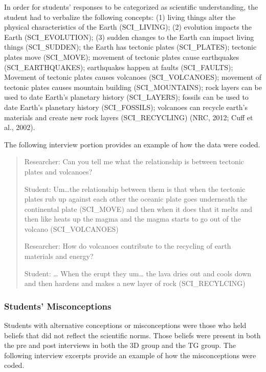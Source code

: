 \documentclass[11.5pt]{sig-alternate} %
\begin{document}
\begin{large}
In order for students’ responses to be categorized as scientific understanding, the student had to verbalize the following concepts: (1) living things alter the physical characteristics of the Earth (SCI\_LIVING); (2)  evolution impacts the Earth (SCI\_EVOLUTION); (3) sudden changes to the Earth can impact living things (SCI\_SUDDEN); the Earth has tectonic plates (SCI\_PLATES); tectonic plates move (SCI\_MOVE); movement of tectonic plates cause earthquakes (SCI\_EARTHQUAKES); earthquakes happen at faults (SCI\_FAULTS); Movement of tectonic plates causes volcanoes (SCI\_VOLCA\-NOES); movement of tectonic plates causes mountain building (SCI\_MOUNTAINS); rock layers can be used to date Earth’s planetary history (SCI\_LAYERS); fossils can be used to date Earth’s planetary history (SCI\_FOSSILS); volcanoes can recycle earth’s materials and create new rock layers  (SCI\_RECYCLING) (NRC, 2012; Cuff et al., 2002).

The following interview portion provides an example of how the data were coded. 

\begin{quote}

Researcher: Can you tell me what the relationship is between tectonic plates and volcanoes?	

Student: Um…the relationship between them is that when the tectonic plates rub up against each other the oceanic plate goes underneath the continental plate (SCI\_MOVE) and then when it does that it melts and then like heats up the magma and the magma starts to go out of the volcano (SCI\_VOLCANOES)

Researcher: How do volcanoes contribute to the recycling of earth materials and energy?

Student: … When the erupt they um… the lava dries out and cools down and then hardens and makes a new layer of rock (SCI\_RECYLCING)


\end{quote}

\subsubsection*{Students' Misconceptions}

Students with alternative conceptions or misconceptions were those who held beliefs that did not reflect the scientific norms.  Those beliefs were present in both the pre and post interviews in both the 3D group and the TG group.  The following interview excerpts provide an example of how the misconceptions were coded.


\end{large}
\end{document}
